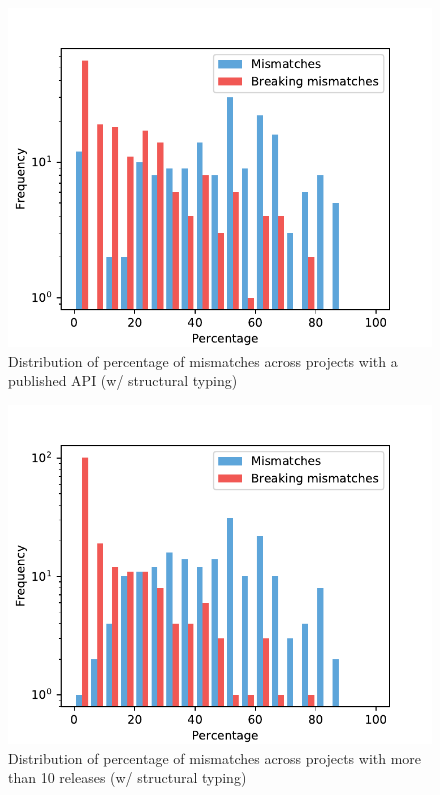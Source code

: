 \documentclass{l4proj}
\begin{document}
\begin{appendices}
\begin{figure}[]
\centering
\caption{Distribution of percentage of mismatches across projects with
a published API (w/ structural typing)}
\label{StrDistributionPublishedAPI}
\includegraphics[height=0.4\textheight]
{images/evaluation/str_distribution_mismatches_major_version_1}
\end{figure}

\begin{figure}[]
\centering
\caption{Distribution of percentage of mismatches across projects with
more than 10 releases (w/ structural typing)}
\label{StrDistributionTenReleases}
\includegraphics[height=0.4\textheight]
{images/evaluation/str_distribution_mismatches_more_than_10}
\end{figure}


\end{appendices}
\end{document}
